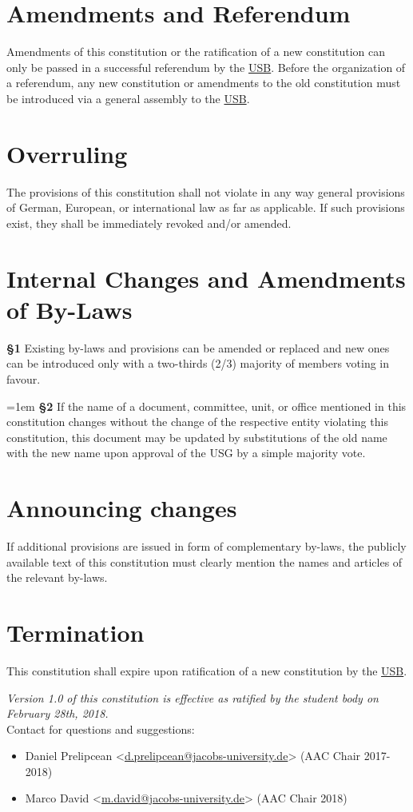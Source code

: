 \documentclass[12pt]{LaTeX_Misc/constitution}
\begin{document}
\section{Amendments and Referendum}
\label{Ammendments}
Amendments of this constitution or the ratification of a new constitution can only be passed in a successful referendum by the \hyperref[studentbody]{USB}. Before the organization of a referendum, any new constitution or amendments to the old constitution must be introduced via a general assembly to the \hyperref[studentbody]{USB}. 

\section{Overruling} 
The provisions of this constitution shall not violate in any way general provisions of German, European, or international law as far as applicable. If such provisions exist, they shall be immediately revoked and/or amended.

\section{Internal Changes and Amendments of By-Laws}\label{sec:internal-changes}
\textbf{\S 1} Existing by-laws and provisions can be amended or replaced and new ones can be introduced only with a two-thirds (2/3) majority of members voting in favour.

{\parindent=1em
\textbf{\S 2} If the name of a document, committee, unit, or office mentioned in this constitution changes without the change of the respective entity violating this constitution, this document may be updated by substitutions of the old name with the new name upon approval of the USG by a simple majority vote.}


\section{Announcing changes}
If additional provisions are issued in form of complementary by-laws, the publicly available text of this constitution must clearly mention the names and articles of the relevant by-laws.


\section{Termination}
This constitution shall expire upon ratification of a new constitution by the \hyperref[studentbody]{USB}.



\vfill
\nolinenumbers
\emph{Version 1.0 of this constitution is effective as ratified by the student body on February 28th, 2018.}\\

Contact for questions and suggestions:
\renewcommand{\labelitemi}{--}
\begin{itemize}[nosep]
\item Daniel Prelipcean <\url{d.prelipcean@jacobs-university.de}> (AAC Chair 2017-2018)
\item Marco David <\url{m.david@jacobs-university.de}> (AAC Chair 2018)
\end{itemize}
\end{document}
